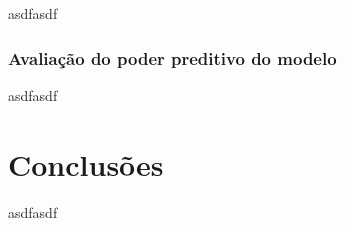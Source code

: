 \documentclass[twocolumn]{rbef}
\newcommand{\1}{\mathbbm{1}}
\begin{document}
asdfasdf

\hypertarget{avaliauxe7uxe3o-do-poder-preditivo-do-modelo}{%
\subsubsection{Avaliação do poder preditivo do modelo}\label{avaliauxe7uxe3o-do-poder-preditivo-do-modelo}}

asdfasdf

\hypertarget{conclusuxf5es}{%
\section{Conclusões}\label{conclusuxf5es}}

asdfasdf



\end{document}
